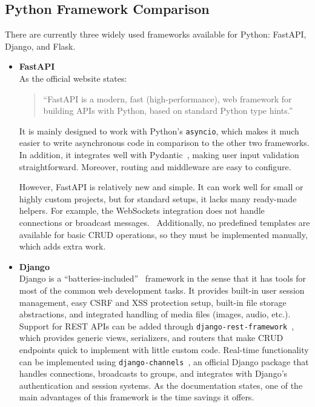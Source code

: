 \subsection{Python Framework Comparison}
There are currently three widely used frameworks
available for Python: FastAPI, Django, and Flask.
\begin{itemize}
    \item \textbf{FastAPI} \\
    As the official website states:
    \begin{quote}
        ``FastAPI is a modern, fast (high-performance), web framework for building APIs
        with Python, based on standard Python type hints.''~\parencite{fastapi}
    \end{quote}
    It is mainly designed to work with Python's \texttt{asyncio}, which makes it much easier
    to write asynchronous code in comparison to the other two frameworks.
    In addition, it integrates well with Pydantic~\parencite{pydantic}, making
    user input validation straightforward.
    Moreover, routing and middleware are easy to configure.~\parencite{fastapi_features}

    However, FastAPI is relatively new and simple.
    It can work well for small or highly custom projects, but for standard
    setups, it lacks many ready-made helpers.
    For example, the WebSockets integration does not handle connections or
    broadcast messages.~\parencite{fastapi_websockets}
    Additionally, no predefined templates are available for basic CRUD
    operations, so they must be implemented manually, which adds extra work.

    \item \textbf{Django} \\
    Django is a ``batteries-included''~\parencite{django} framework in the sense that it has
    tools for most of the common web development tasks.
    It provides built-in user session management, easy CSRF and XSS protection setup,
    built-in file storage abstractions, and integrated handling of media files (images, audio, etc.).
    Support for REST APIs can be added through
    \texttt{django\hyp rest\hyp framework}~\parencite{drf}, which provides generic views,
    serializers, and routers that make CRUD endpoints quick to implement with little custom code.
    Real-time functionality can be implemented using \texttt{django-channels}~\parencite{django_channels},
    an official Django package that handles connections, broadcasts to groups,
    and integrates with Django's authentication and session systems.
    As the documentation states, one of the main advantages of
    this framework is the time savings it offers.~\parencite{django_overview}


\end{itemize}
